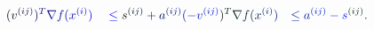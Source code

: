 \documentclass[12pt]{article}
\begin{document}
\makeatletter
\renewcommand*{\@textcolor}[3]{%
  \protect\leavevmode
  \begingroup
    \color#1{#2}#3%
  \endgroup
}
\makeatother
\begin{displaymath}
\begin{array} {rlr} \displaystyle { \mathcolor[RGB]{0,0,15}{(} \mathcolor[RGB]{0,0,30}{v} ^ { \mathcolor[RGB]{0,0,45}{(} \mathcolor[RGB]{0,0,60}{i} \mathcolor[RGB]{0,0,75}{j} \mathcolor[RGB]{0,0,90}{)} } \mathcolor[RGB]{0,0,105}{)} ^ { \mathcolor[RGB]{0,0,120}{T} } \mathcolor[RGB]{0,0,135}{\nabla} \mathcolor[RGB]{0,0,150}{f} \mathcolor[RGB]{0,0,165}{(} \mathcolor[RGB]{0,0,180}{x} ^ { \mathcolor[RGB]{0,0,195}{(} \mathcolor[RGB]{0,0,210}{i} \mathcolor[RGB]{0,0,225}{)} } \mathcolor[RGB]{0,0,240}{)} } & \displaystyle { { } \mathcolor[RGB]{0,0,255}{\leq} \mathcolor[RGB]{0,15,0}{s} ^ { \mathcolor[RGB]{0,15,15}{(} \mathcolor[RGB]{0,15,30}{i} \mathcolor[RGB]{0,15,45}{j} \mathcolor[RGB]{0,15,60}{)} } \mathcolor[RGB]{0,15,75}{+} \mathcolor[RGB]{0,15,90}{a} ^ { \mathcolor[RGB]{0,15,105}{(} \mathcolor[RGB]{0,15,120}{i} \mathcolor[RGB]{0,15,135}{j} \mathcolor[RGB]{0,15,150}{)} } \mathcolor[RGB]{0,15,165}{(} \mathcolor[RGB]{0,15,180}{-} \mathcolor[RGB]{0,15,195}{v} ^ { \mathcolor[RGB]{0,15,210}{(} \mathcolor[RGB]{0,15,225}{i} \mathcolor[RGB]{0,15,240}{j} \mathcolor[RGB]{0,15,255}{)} } \mathcolor[RGB]{0,30,0}{)} ^ { \mathcolor[RGB]{0,30,15}{T} } \mathcolor[RGB]{0,30,30}{\nabla} \mathcolor[RGB]{0,30,45}{f} \mathcolor[RGB]{0,30,60}{(} \mathcolor[RGB]{0,30,75}{x} ^ { \mathcolor[RGB]{0,30,90}{(} \mathcolor[RGB]{0,30,105}{i} \mathcolor[RGB]{0,30,120}{)} } \mathcolor[RGB]{0,30,135}{)} } & \displaystyle { \mathcolor[RGB]{0,30,150}{\leq} \mathcolor[RGB]{0,30,165}{a} ^ { \mathcolor[RGB]{0,30,180}{(} \mathcolor[RGB]{0,30,195}{i} \mathcolor[RGB]{0,30,210}{j} \mathcolor[RGB]{0,30,225}{)} } \mathcolor[RGB]{0,30,240}{-} \mathcolor[RGB]{0,30,255}{s} ^ { \mathcolor[RGB]{0,45,0}{(} \mathcolor[RGB]{0,45,15}{i} \mathcolor[RGB]{0,45,30}{j} \mathcolor[RGB]{0,45,45}{)} } \mathcolor[RGB]{0,45,60}{.} } \end{array}
\end{displaymath}
\end{document}
